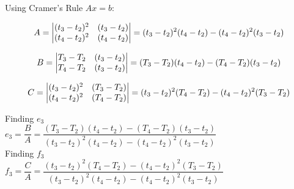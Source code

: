 \documentclass[12pt, titlepage]{article}
\begin{document}
		Using Cramer's Rule $Ax =b$:
		
		\[A= 
%
		\begin{vmatrix} 
		(t_3 - t_2)^2 & (t_3 - t_2) \\
		(t_4 - t_2)^2 & (t_4 - t_2) 
		\end{vmatrix}
%		
		= (t_3 - t_2)^2(t_4 - t_2) - (t_4 - t_2)^2 (t_3 - t_2)\\
		\]


		\[B= 
%
		\begin{vmatrix} 
		T_3 - T_2  & (t_3 - t_2) \\
		T_4 - T_2  & (t_3 - t_2) 
		\end{vmatrix}
%		
		= (T_3 - T_2)(t_4 - t_2) - (T_4 - T_2) (t_3 - t_2)\\
		\]

		\[C= 
%
		\begin{vmatrix} 
		(t_3 - t_2)^2 & (T_3 - T_2) \\
		(t_4 - t_2)^2 & (T_4 - T_2) 
		\end{vmatrix}
%		
		= (t_3 - t_2)^2(T_4 - T_2) - (t_4 - t_2)^2 (T_3 - T_2)\\
		\]

		Finding $e_3$\\
		$e_3 = \dfrac{B}{A} = \dfrac{(T_3 - T_2)(t_4 - t_2) - (T_4 - T_2) (t_3 - t_2)}{(t_3 - t_2)^2(t_4 - t_2) - (t_4 - t_2)^2 (t_3 - t_2)}$\\

		Finding $f_3$\\
		$f_3 = \dfrac{C}{A} = \dfrac{ (t_3 - t_2)^2(T_4 - T_2) - (t_4 - t_2)^2 (T_3 - T_2)}{(t_3 - t_2)^2(t_4 - t_2) - (t_4 - t_2)^2 (t_3 - t_2)}$
\end{document}
